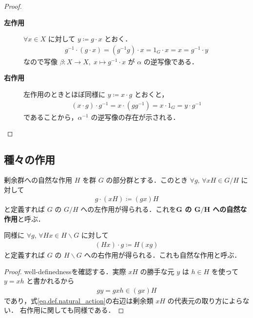 \documentclass[geometry_main]{subfiles}
\begin{document}
\begin{proof}
	\begin{description}
		\item[\textbf{左作用}] $\forall x \in X$ に対して $y \coloneqq g \cdot x$ とおく．
		\begin{align}
			g^{-1} \cdot (g \cdot x) = (g^{-1}g) \cdot x = 1_G \cdot x = x = g^{-1} \cdot y
		\end{align}
		なので写像 $\beta \colon X \to X,\; x \mapsto g^{-1} \cdot x$ が $\alpha$ の逆写像である．
		\item[\textbf{右作用}] 左作用のときとほぼ同様に $y \coloneqq x \cdot g$ とおくと，
		\begin{align}
			(x \cdot g) \cdot g^{-1} = x \cdot (gg^{-1}) = x \cdot 1_G = y \cdot g^{-1}
		\end{align}
		であることから，$\alpha^{-1}$ の逆写像の存在が示される．
	\end{description}
\end{proof}

\subsection{種々の作用}

\begin{mydef}[label=def.natural_action]{剰余群への自然な作用}
	$H$ を群 $G$ の部分群とする．このとき $\forall g,\, \forall xH \in G/H$ に対して
	\begin{align}
		\label{eq.def.natural_action}
		g \cdot (xH) \coloneqq (gx) H
	\end{align}
	と定義すれば $G$ の $G/H$ への左作用が得られる．これを\textbf{$\bm{G}$ の $\bm{G/H}$ への自然な作用}と呼ぶ．
	
	同様に $\forall g,\, \forall Hx \in H\backslash G$ に対して
	\begin{align}
		(Hx) \cdot g \coloneqq H(xg)
	\end{align}
	と定義すれば $G$ の $H\backslash G$ への右作用が得られる．これも自然な作用と呼ぶ．
\end{mydef}

\begin{proof}
	well-definednessを確認する．実際 $xH$ の勝手な元 $y$ は $h \in H$ を使って $y = xh$ と書かれるから
	\begin{align}
		gy = gxh \in (gx) H
	\end{align}
	であり，式\eqref{eq.def.natural_action}の右辺は剰余類 $xH$ の代表元の取り方によらない．
	右作用に関しても同様である．
\end{proof}
\end{document}
